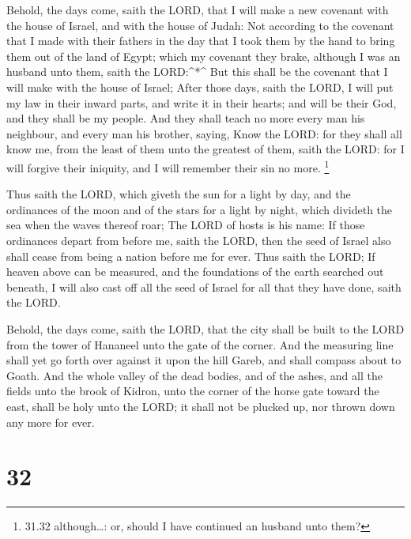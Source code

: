  Behold, the days come, saith the LORD, that I will make a
new covenant with the house of Israel, and with the house of Judah:
 Not according to the covenant that I made with their
fathers in the day that I took them by the hand to bring them out of the
land of Egypt; which my covenant they brake, although I was an husband
unto them, saith the LORD:\^{}*\^{}  But this shall be the
covenant that I will make with the house of Israel; After those days,
saith the LORD, I will put my law in their inward parts, and write it in
their hearts; and will be their God, and they shall be my people.
 And they shall teach no more every man his neighbour, and
every man his brother, saying, Know the LORD: for they shall all know
me, from the least of them unto the greatest of them, saith the LORD:
for I will forgive their iniquity, and I will remember their sin no
more. \footnote{31.32 although\ldots: or, should I have continued an
  husband unto them?}

 Thus saith the LORD, which giveth the sun for a light by
day, and the ordinances of the moon and of the stars for a light by
night, which divideth the sea when the waves thereof roar; The LORD of
hosts is his name:  If those ordinances depart from before
me, saith the LORD, then the seed of Israel also shall cease from being
a nation before me for ever.  Thus saith the LORD; If
heaven above can be measured, and the foundations of the earth searched
out beneath, I will also cast off all the seed of Israel for all that
they have done, saith the LORD.

 Behold, the days come, saith the LORD, that the city shall
be built to the LORD from the tower of Hananeel unto the gate of the
corner.  And the measuring line shall yet go forth over
against it upon the hill Gareb, and shall compass about to Goath.
 And the whole valley of the dead bodies, and of the ashes,
and all the fields unto the brook of Kidron, unto the corner of the
horse gate toward the east, shall be holy unto the LORD; it shall not be
plucked up, nor thrown down any more for ever.

\hypertarget{section-31}{%
\section{32}\label{section-31}}

